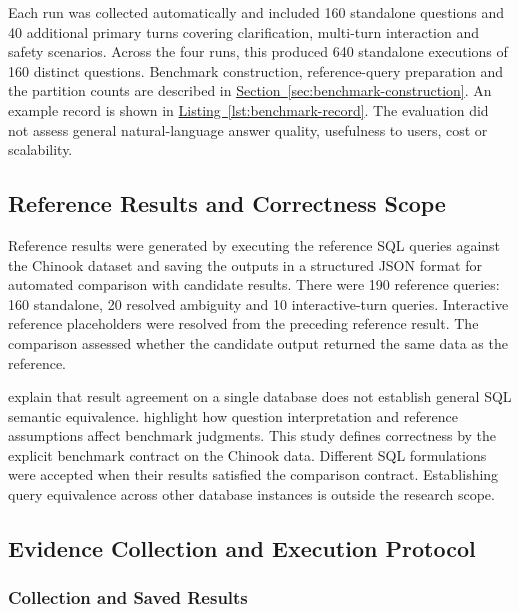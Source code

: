 Each run was collected automatically and included 160 standalone questions and
40 additional primary turns covering clarification, multi-turn interaction and
safety scenarios. Across the four runs, this produced 640 standalone executions
of 160 distinct questions.
Benchmark construction, reference-query preparation and the partition counts
are described in \hyperref[sec:benchmark-construction]{Section~\ref*{sec:benchmark-construction}}.
An example record is shown in \hyperref[lst:benchmark-record]{Listing~\ref*{lst:benchmark-record}}.
The evaluation did not assess general natural-language answer quality, usefulness
to users, cost or scalability.

\subsection{Reference Results and Correctness Scope}
\label{sec:reference-results}

Reference results were generated by executing the reference SQL queries against the Chinook dataset
and saving the outputs in a structured JSON format for automated comparison with candidate results.
There were 190 reference queries: 160 standalone, 20 resolved ambiguity and 10
interactive-turn queries. Interactive reference placeholders were resolved from
the preceding reference result.
The comparison assessed whether the candidate output returned the same data as the reference.

\citet{zhong2020semantic} explain that result agreement on a single database
does not establish general SQL semantic equivalence.
\citet{pourreza2023evaluating} highlight how question interpretation and
reference assumptions affect benchmark judgments.
This study defines correctness by the explicit benchmark contract on the Chinook data.
Different SQL formulations were accepted when their results satisfied the
comparison contract. Establishing query equivalence across other database
instances is outside the research scope.

\subsection{Evidence Collection and Execution Protocol}
\label{sec:protocol}

\subsubsection{Collection and Saved Results}
\label{sec:runner-evidence}

